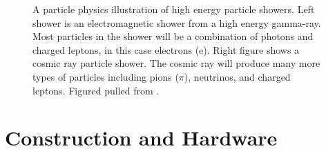 \begin{figure}
    \caption{A particle physics illustration of high energy particle showers. Left shower is an electromagnetic shower from a high energy gamma-ray. Most particles in the shower will be a combination of photons and charged leptons, in this case electrons (e). Right figure shows a cosmic ray particle shower. The cosmic ray will produce many more types of particles including pions ($\pi$), neutrinos, and charged leptons. Figured pulled from \cite{lopez_thesis}.}
    \label{fig:airshowers}
\end{figure}

\section{Construction and Hardware}

